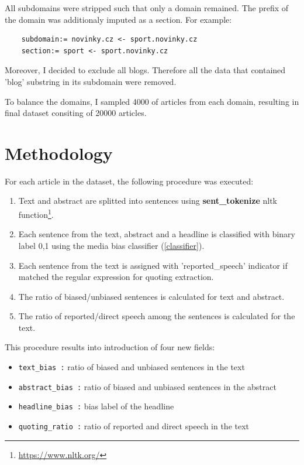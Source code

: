 All subdomains were stripped such that only a domain remained. The prefix of the domain was additionaly imputed as a section. For example:
\begin{verbatim}
    subdomain:= novinky.cz <- sport.novinky.cz 
    section:= sport <- sport.novinky.cz
\end{verbatim}

Moreover, I decided to exclude all blogs. Therefore all the data that contained 'blog' substring in its subdomain were removed.

To balance the domains, I sampled 4000 of articles from each domain, resulting in final dataset consiting of 20000 articles.


\section{Methodology}
For each article in the dataset, the following procedure was executed:
\begin{enumerate}
    \item Text and abstract are splitted into sentences using \textbf{sent\_tokenize} nltk function\footnote{\url{https://www.nltk.org/}}.
    \item Each sentence from the text, abstract and a headline is classified with binary label 0,1 using the media bias classifier (\ref{classifier}).
    \item Each sentence from the text is assigned with 'reported\_speech' indicator if matched the regular expression for quoting extraction. 
    \item The ratio of biased/unbiased sentences is calculated for text and abstract.
    \item The ratio of reported/direct speech among the sentences is calculated for the text.
\end{enumerate}

This procedure results into introduction of four new fields:
\begin{itemize}
    \item \verb|text_bias :| ratio of biased and unbiased sentences in the text
    \item \verb|abstract_bias :| ratio of biased and unbiased sentences in the abstract
    \item \verb|headline_bias :| bias label of the headline
    \item \verb|quoting_ratio :| ratio of reported and direct speech in the text     
\end{itemize}




